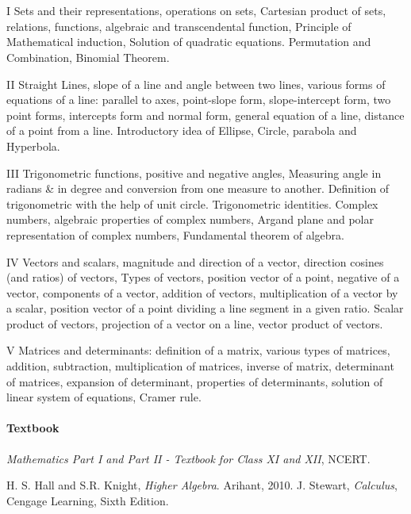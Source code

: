 
\section{\courseinfo}

\unit{I}
Sets and their representations, operations on sets, Cartesian product of sets, relations, functions, algebraic and transcendental function, Principle of Mathematical induction, Solution of quadratic equations. Permutation and Combination, Binomial Theorem.

\unit{II}
Straight Lines, slope of a line and angle between two lines, various forms of equations of a line: parallel to axes, point-slope form, slope-intercept form, two point forms, intercepts form and normal form, general equation of a line, distance of a point from a line. Introductory idea of Ellipse, Circle, parabola and Hyperbola.
 
\unit{III}
 Trigonometric functions, positive and negative angles, Measuring angle in radians \& in degree and conversion from one measure to another. Definition of trigonometric  with the help of unit circle. Trigonometric identities. Complex numbers, algebraic properties of complex numbers, Argand plane and polar representation of complex numbers, Fundamental theorem of algebra.
 
\unit{IV}
Vectors and scalars, magnitude and direction of a vector, direction cosines (and ratios) of vectors, Types of vectors, position vector of a point, negative of a vector, components of a vector, addition of vectors, multiplication of a vector by a scalar, position vector of a point dividing a line segment in a given ratio. Scalar product of vectors, projection of a vector on a line, vector product of vectors.
 
\unit{V}
 Matrices and determinants: definition of a matrix, various types of matrices, addition, subtraction, multiplication of matrices, inverse of matrix, determinant of matrices, expansion of determinant, properties of determinants, solution of linear system of equations, Cramer rule.

\paragraph{Textbook}
\emph{Mathematics Part I and Part II - Textbook for Class XI and XII}, NCERT.

\begin{thebibliography}{}
\let\clearpage\relax
{} H. S. Hall and S.R. Knight, \emph{Higher Algebra}. Arihant, 2010.
 J. Stewart, \emph{Calculus}, Cengage Learning, Sixth Edition.

\end{thebibliography}














